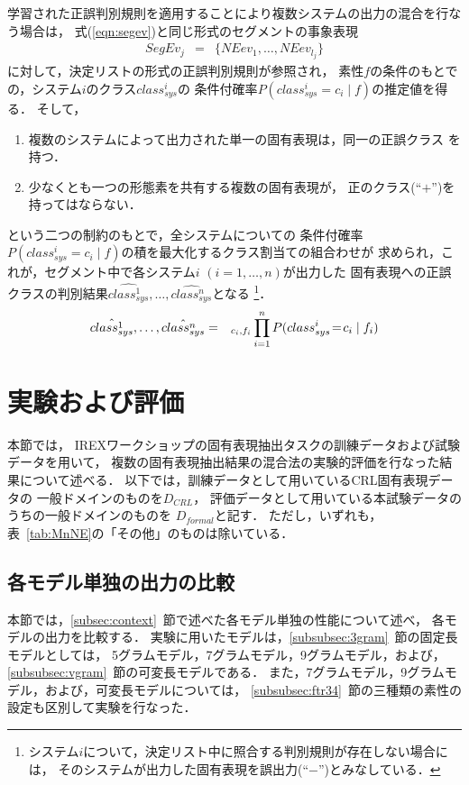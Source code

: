学習された正誤判別規則を適用することにより複数システムの出力の混合を行なう場合は，
式(\ref{eqn:segev})と同じ形式のセグメントの事象表現
\begin{eqnarray*}
 SegEv_j & = & \{ NEev_1,\ldots,NEev_{l_j} \} 
\end{eqnarray*}
に対して，決定リストの形式の正誤判別規則が参照され，
素性$f$の条件のもとでの，システム$i$のクラス$class_{sys}^i$の
条件付確率$P(class_{sys}^i\!=\!c_i\mid f)$の推定値を得る．
そして，
\begin{enumerate}
\item 複数のシステムによって出力された単一の固有表現は，同一の正誤クラス
      を持つ．
\item 少なくとも一つの形態素を共有する複数の固有表現が，
      正のクラス(``$+$'')を持ってはならない．
\end{enumerate}
という二つの制約のもとで，全システムについての
条件付確率$P(class_{sys}^i\!=\!c_i\mid f)$の積を最大化するクラス割当ての組合わせが
求められ，これが，セグメント中で各システム$i$
 $(i=1,\ldots,n)$が出力した
固有表現への正誤クラスの判別結果$\hat{class_{sys}^1},\ldots,\hat{class_{sys}^n}$となる
\footnote{
  システム$i$について，決定リスト中に照合する判別規則が存在しない場合には，
  そのシステムが出力した固有表現を誤出力(``$-$'')とみなしている．
}．
\begin{eqnarray*}
\hat{class_{sys}^1},\ldots,\hat{class_{sys}^n} & = &
	_{c_i, f_i} \prod_{i=1}^{n} P(class_{sys}^i\!=\!c_i\mid f_i)
\end{eqnarray*}




\section{実験および評価}
\label{sec:experi}

本節では，
IREXワークショップの固有表現抽出タスクの訓練データおよび試験データを用いて，
複数の固有表現抽出結果の混合法の実験的評価を行なった結果について述べる．
以下では，訓練データとして用いているCRL固有表現データの
一般ドメインのものを$D_{CRL}$，
評価データとして用いている本試験データのうちの一般ドメインのものを
$D_{formal}$と記す．
ただし，いずれも，表~\ref{tab:MnNE}の「その他」のものは除いている．

\subsection{各モデル単独の出力の比較}
\label{subsec:indiv}


本節では，\ref{subsec:context}~節で述べた各モデル単独の性能について述べ，
各モデルの出力を比較する．
実験に用いたモデルは，\ref{subsubsec:3gram}~節の固定長モデルとしては，
5グラムモデル，7グラムモデル，9グラムモデル，および，
\ref{subsubsec:vgram}~節の可変長モデルである．
また，7グラムモデル，9グラムモデル，および，可変長モデルについては，
\ref{subsubsec:ftr34}~節の三種類の素性の設定も区別して実験を行なった．

